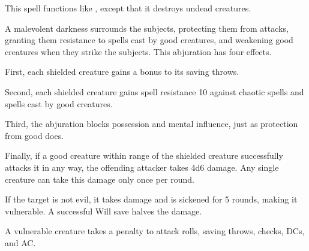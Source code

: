 \begin{spelleffect}
  This spell functions like , except that it destroys undead creatures.
\end{spelleffect}

\begin{spelleffect}
  A malevolent darkness surrounds the subjects, protecting them from attacks, granting them resistance to spells cast by good creatures, and weakening good creatures when they strike the subjects. This abjuration has four effects.
  \par First, each shielded creature gains a  bonus to its saving throws.
  \par Second, each shielded creature gains spell resistance 10 against chaotic spells and spells cast by good creatures.
  \par Third, the abjuration blocks possession and mental influence, just as protection from good does.
  \par Finally, if a good creature within \rngmed range of the shielded creature successfully attacks it in any way, the offending attacker takes 4d6 damage. Any single creature can take this damage only once per round.
\end{spelleffect}

\spellrng{\rngmed}
\begin{spelleffect}
  If the target is not evil, it takes damage and is sickened for 5 rounds, making it vulnerable. A successful Will save halves the damage.
\end{spelleffect}
\begin{spellnotes}
  A vulnerable creature takes a  penalty to attack rolls, saving throws, checks, DCs, and AC.
\end{spellnotes}

